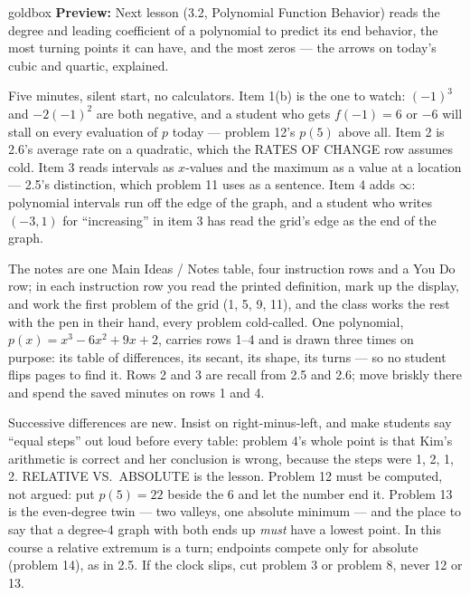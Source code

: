 \documentclass[10pt]{article}
\begin{document}
\begin{skillbox}{goldbox}
\textbf{Preview:} Next lesson (3.2, Polynomial Function Behavior) reads the degree and leading
coefficient of a polynomial to predict its end behavior, the most turning points it can have,
and the most zeros --- the arrows on today's cubic and quartic, explained.
\end{skillbox}

\begin{teachernote}[Warm-Up]
Five minutes, silent start, no calculators. Item 1(b) is the one to watch: $(-1)^3$ and
$-2(-1)^2$ are both negative, and a student who gets $f(-1) = 6$ or $-6$ will stall on every
evaluation of $p$ today --- problem 12's $p(5)$ above all. Item 2 is 2.6's average rate on a
quadratic, which the RATES OF CHANGE row assumes cold. Item 3 reads intervals as $x$-values and
the maximum as a value at a location --- 2.5's distinction, which problem 11 uses as a sentence.
Item 4 adds $\infty$: polynomial intervals run off the edge of the graph, and a student who
writes $(-3, 1)$ for ``increasing'' in item 3 has read the grid's edge as the end of the graph.
\end{teachernote}

\begin{teachernote}
The notes are one Main Ideas / Notes table, four instruction rows and a You Do row; in each
instruction row you read the printed definition, mark up the display, and work the first problem
of the grid (1, 5, 9, 11), and the class works the rest with the pen in their hand, every problem
cold-called. One polynomial, $p(x) = x^3 - 6x^2 + 9x + 2$, carries rows 1--4 and is drawn three
times on purpose: its table of differences, its secant, its shape, its turns --- so no student
flips pages to find it. Rows 2 and 3 are recall from 2.5 and 2.6; move briskly there and spend
the saved minutes on rows 1 and 4.

Successive differences are new. Insist on right-minus-left, and make students say ``equal steps''
out loud before every table: problem 4's whole point is that Kim's arithmetic is correct and her
conclusion is wrong, because the steps were 1, 2, 1, 2. RELATIVE VS.\ ABSOLUTE is the lesson.
Problem 12 must be computed, not argued: put $p(5) = 22$ beside the 6 and let the number end it.
Problem 13 is the even-degree twin --- two valleys, one absolute minimum --- and the place to say
that a degree-4 graph with both ends up \emph{must} have a lowest point. In this course a relative
extremum is a turn; endpoints compete only for absolute (problem 14), as in 2.5. If the clock
slips, cut problem 3 or problem 8, never 12 or 13.
\end{teachernote}
\end{document}
